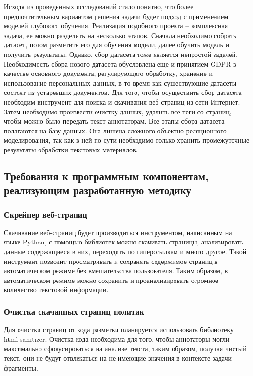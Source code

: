 \documentclass[../main]{subfiles}
\begin{document}
Исходя из проведенных исследований стало понятно, что более предпочтительным вариантом решения задачи будет подход с применением моделей глубокого обучения. Реализация подобного проекта -- комплексная задача, ее можно разделить на несколько этапов. Сначала необходимо собрать датасет, потом разметить его для обучения модели, далее обучить модель и получить результаты. Однако, сбор датасета тоже является непростой задачей. Необходимость сбора нового датасета обусловлена еще и принятием GDPR в качестве основного документа, регулирующего обработку, хранение и использование персональных данных, в то время как существующие датасеты состоят из устаревших документов. Для того, чтобы осуществить сбор датасета необходим инструмент для поиска и скачивания веб-страниц из сети Интернет. Затем необходимо произвести очистку данных, удалить все теги со страниц, чтобы можно было передать текст аннотаторам. Все этапы сбора датасета полагаются на базу данных. Она лишена сложного объектно-реляционного моделирования, так как в ней по сути необходимо только хранить промежуточные результаты обработки текстовых материалов.

\subsection{Требования к программным компонентам, реализующим разработанную методику}

\subsubsection{Скрейпер веб-страниц}
Скачивание веб-страниц будет производиться инструментом, написанным на языке Python, с помощью библиотек можно скачивать страницы, анализировать данные содержащиеся в них, переходить по гиперссылкам и много другое. Такой инструмент позволит просматривать и сохранять содержимое страниц в автоматическом режиме без вмешательства пользователя. Таким образом, в автоматическом режиме можно сохранить и проанализировать огромное количество текстовой информации.

\subsubsection{Очистка скачанных страниц политик}
Для очистки страниц от кода разметки планируется использовать библиотеку html-sanitizer. Очистка кода необходима для того, чтобы аннотаторы могли максимально сфокусироваться на анализе текста, таким образом, получая чистый текст, они не будут отвлекаться на не имеющие значения в контексте задачи фрагменты.
\end{document}
